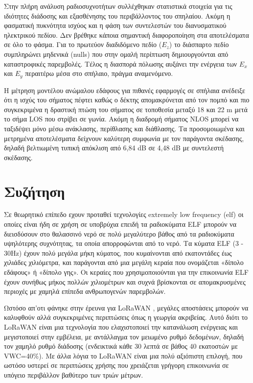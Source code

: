 \documentclass[12pt, greek]{article}
\begin{document}
\begin{multicols*}{2}
        Στην πλήρη ανάλυση ραδιοσυχνοτήτων \cite{pingenot_full_2005} συλλέχθηκαν στατιστικά στοιχεία
        για τις ιδιότητες διάδοσης και εξασθένησης του περιβάλλοντος του σπηλαίου. Ακόμη η φασματική
        πυκνότητα ισχύος και η φάση των συντελεστών του διανυσματικού ηλεκτρικού πεδίου. Δεν βρέθηκε
        κάποια σημαντική διαφοροποίηση στα αποτελέσματα σε όλο το φάσμα. Για το πρωτεύον διαδιδόμενο
        πεδίο ($E_z$) το διάσπαρτο πεδίο συμπληρώνει μηδενικά (nulls) που στην ομαλή περίπτωση 
        δημιουργούνται από καταστροφικές παρεμβολές. Τέλος η διασπορά πόλωσης αυξάνει την ενέργεια
        των $E_x$ και $E_y$ περαιτέρω μέσα στο σπήλαιο, πράγμα αναμενόμενο.

        Η μέτρηση μοντέλου ανώμαλου εδάφους για πιθανές εφαρμογές σε σπήλαια \cite{soo_measurement_2019}
        ανέδειξε ότι η ισχύς του σήματος πέφτει καθώς ο δέκτης απομακρύνεται από τον πομπό και πιο
        συγκεκριμένα η δραστική πτώση του σήματος σε τοποθεσία μεταξύ 18 και 22 m μετά το σήμα LOS
        που στρίβει σε γωνία. Ακόμη η διαδρομή σήματος NLOS μπορεί να ταξιδέψει μόνο μέσω ανάκλασης,
        περίθλασης και διάθλασης. Τα προσομοιωμένα και μετρημένα αποτελέσματα δείχνουν καλύτερη συμφωνία
        με τον παράγοντα σκέδασης, δηλαδή βελτιωμένη τυπική απόκλιση από 6,84 dB σε 4,48 dB με συντελεστή
        σκέδασης.

    \section{\normalsize  \textsf{Συζήτηση}}
        Σε θεωρητικό επίπεδο εχουν προταθεί τεχνολογίες extremely low frequency
        (elf) οι οποίες είναι ήδη σε χρήση σε υποβρύχια επειδή τα ραδιοκύματα ELF μπορούν να
        διεισδύσουν στο θαλασσινό νερό σε πολύ μεγαλύτερο βάθος από τα ραδιοκύματα υψηλότερης
        συχνότητας, τα οποία απορροφώνται από το νερό. Τα κύματα ELF (3 - 30Hz) έχουν πολύ
        μεγάλα μήκη κύματος, που κυμαίνονται από εκατοντάδες έως χιλιάδες χιλιόμετρα, και
        παράγονται από μια μεγάλη κεραία που ονομάζεται «δίπολο εδάφους» ή «δίπολο γης». Οι
        κεραίες που χρησιμοποιούνται για την επικοινωνία ELF έχουν συνήθως μήκος πολλών
        χιλιομέτρων και συχνά βρίσκονται σε απομακρυσμένες περιοχές με χαμηλά επίπεδα
        ανθρωπογενών παρεμβολών.

        Ωστόσο απ'οτι φάνηκε στην έρευνα για LoRaWAN \cite{zhao_feasibility_2023}, μεγάλες 
        αποστάσεις μπορούν να καλυφθούν αλλά συγκεκριμένες περιπτώσεις όπως η γεωργία ακριβείας.
        Αυτό διότι το LoRaWAN είναι μια τεχνολογία που ελαχιστοποιεί την κατανάλωση ενέργειας και
        μεγιστοποιεί στην εμβέλεια, με αντάλλαγμα τον μειωμένο ρυθμό δεδομένων, δηλαδή τον χαμηλό
        ρυθμό διάδοσης (ενδεικτικά κάθε 30 λεπτά σε βάθος 40 εκατοστών με VWC=40\%). Με άλλα
        λόγια το LoRaWAN είναι μια πολύ αξιόπιστη επιλογή, που ωστόσο υστερεί σε περιπτώσεις 
        χρήσης που χρειάζεται γρήγορη επικοινωνία σε υπόγειο περιβάλλον βαθύτερο των τριών μέτρων.


\end{multicols*}
\end{document}
